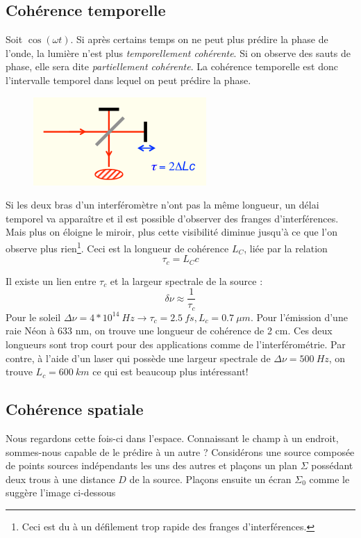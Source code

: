 	\subsection{Cohérence temporelle}
	Soit $\cos(\omega t)$. Si après certains temps on ne peut plus prédire la phase de l'onde, la lumière n'est 
	plus \textit{temporellement cohérente}. Si on observe des sauts de phase, elle sera dite \textit{partiellement 
	cohérente}. La cohérence temporelle est donc l'intervalle temporel dans lequel on peut prédire la phase. \\
	
	\begin{figure}
	\vspace{-5mm}
	\includegraphics[scale=0.65]{ch1/image6.png}
	\end{figure}
	Si les deux bras d'un interféromètre n'ont pas la même longueur, un délai temporel va apparaître et il est 
	possible d'observer des franges d'interférences. Mais plus on éloigne le miroir, plus cette visibilité 
	diminue jusqu'à ce que l'on observe plus rien\footnote{Ceci est du à un défilement trop rapide des franges
	 d'interférences.}. Ceci est la longueur de cohérence $L_C$, liée par la relation
	\begin{equation}
	\tau_c = L_Cc
	\end{equation}
	
	Il existe un lien entre $\tau_c$ et la largeur spectrale de la source :
	\begin{equation}
	\delta\nu \approx \frac{1}{\tau_c}
	\end{equation}
	Pour le soleil $\Delta\nu =4*10^{14}\ Hz \to \tau_c = 2.5\ fs, L_c=0.7\ \mu m$. Pour l'émission d'une raie
	Néon à 633 nm, on trouve une longueur de cohérence de 2 cm. Ces deux longueurs sont trop court pour des 
	applications comme de l'interférométrie. Par contre, à l'aide d'un laser qui possède une largeur 
	spectrale de $\Delta \nu  = 500\ Hz$, on trouve $L_c=600\ km$ ce qui est beaucoup plus intéressant!
	
	
	\subsection{Cohérence spatiale}
	Nous regardons cette fois-ci dans l'espace. Connaissant le champ à un endroit, sommes-nous capable de 
	le prédire à un autre ? Considérons une source composée de points sources indépendants les uns des autres 
	et plaçons un plan $\Sigma$ possédant deux trous à une distance $D$ de la source. Plaçons ensuite un écran 
	$\Sigma_0$ comme le suggère l'image ci-dessous

